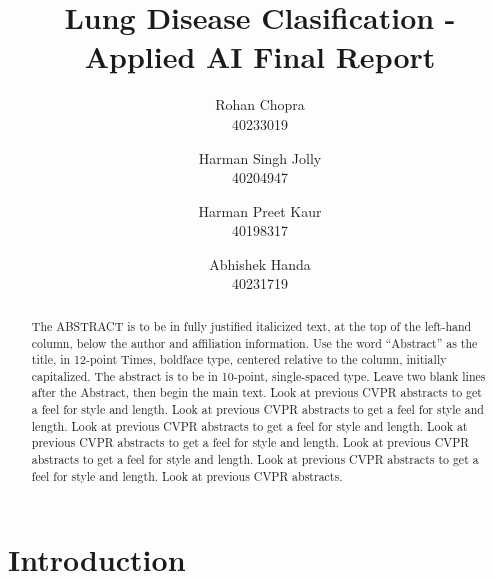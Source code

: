\documentclass[10pt,twocolumn,letterpaper]{article}
\def\subName{Applied AI }
\begin{document}
\def\cvprPaperID{Group-Q} %
\def\confName{COMP6721}
\def\confYear{2022}

\title{Lung Disease Clasification - \subName Final Report}
\author{Rohan Chopra\\
\small 40233019\\
\and
Harman Singh Jolly\\
\small 40204947\\
\and
Harman Preet Kaur\\
\small 40198317\\
\and
Abhishek Handa\\
\small 40231719\\
}
\maketitle

\begin{abstract}
  The ABSTRACT is to be in fully justified italicized text, at the top of the left-hand column, 
  below the author and affiliation information.
  Use the word ``Abstract'' as the title, in 12-point Times, boldface type, centered relative 
  to the column, initially capitalized.
  The abstract is to be in 10-point, single-spaced type.
  Leave two blank lines after the Abstract, then begin the main text.
  Look at previous CVPR abstracts to get a feel for style and length.
  Look at previous CVPR abstracts to get a feel for style and length.
  Look at previous CVPR abstracts to get a feel for style and length.
  Look at previous CVPR abstracts to get a feel for style and length.
  Look at previous CVPR abstracts to get a feel for style and length.
  Look at previous CVPR abstracts to get a feel for style and length.
  Look at previous CVPR abstracts.
\end{abstract}

\section{Introduction}
\label{sec:intro}
\end{document}
